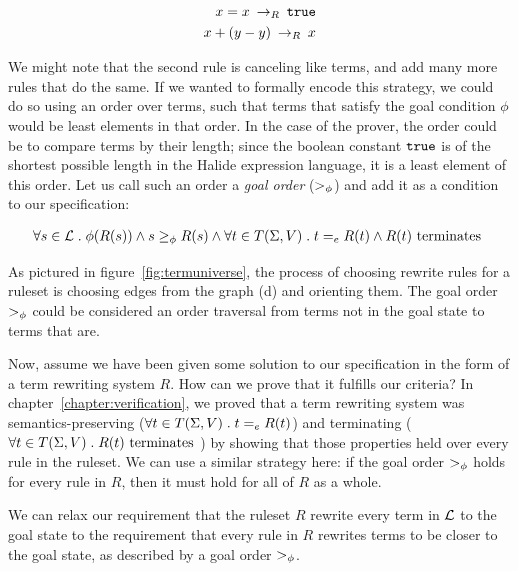 \begin{align*}
    x = x \:\rightarrow_{R}\: \texttt{true} \\
    x + (y - y) \:\rightarrow_{R}\: x
\end{align*}

We might note that the second rule is canceling like terms, and add many more rules that do the same. If we wanted to formally encode this strategy, we could do so using an order over terms, such that terms that satisfy the goal condition $\phi$ would be least elements in that order. In the case of the prover, the order could be to compare terms by their length; since the boolean constant $\texttt{true}$ is of the shortest possible length in the Halide expression language, it is a least element of this order. Let us call such an order a \emph{goal order} ($>_{\phi}$) and add it as a condition to our specification:

\begin{align*}
\forall s \in \mathcal{L} \;.\; \phi(R(s)) \wedge  s \geq_{\phi} R(s) \wedge \forall t \in T(\Sigma,V) \;.\; t =_e R(t) \wedge  R(t) \textrm{ terminates }
\end{align*}

As pictured in figure~\ref{fig:termuniverse}, the process of choosing rewrite rules for a ruleset is choosing edges from the graph (d) and orienting them. The goal order $>_{\phi}$ could be considered an order traversal from terms not in the goal state to terms that are. 

Now, assume we have been given some solution to our specification in the form of a term rewriting system $R$. How can we prove that it fulfills our criteria? In chapter~\ref{chapter:verification}, we proved that a term rewriting system was semantics-preserving ($\forall t \in T(\Sigma,V) \;.\; t =_e R(t)$) and terminating ($\forall t \in T(\Sigma,V) \;.\; R(t) \textrm{ terminates }$) by showing that those properties held over every rule in the ruleset. We can use a similar strategy here: if the goal order $>_{\phi}$ holds for every rule in $R$, then it must hold for all of $R$ as a whole.

\begin{assumption}
We can relax our requirement that the ruleset $R$ rewrite every term in $\mathcal{L}$ to the goal state to the requirement that every rule in $R$ rewrites terms to be closer to the goal state, as described by a goal order $>_{\phi}$.
\end{assumption}

